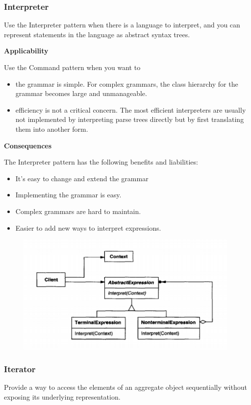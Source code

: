 \documentclass{article}
\begin{document}
\newpage
\subsubsection{Interpreter}

Use the Interpreter pattern when there is a language to interpret, and you can represent statements in the language as abstract syntax trees.

\textbf{Applicability}

Use the Command pattern when you want to

\begin{itemize}
    \item the grammar is simple. For complex grammars, the class hierarchy for the grammar becomes large and unmanageable. 
    \item efficiency is not a critical concern. The most efficient interpreters are usually not implemented by interpreting parse trees directly but by first translating them into another form.
\end{itemize}

\textbf{Consequences}

The Interpreter pattern has the following benefits and liabilities:
\begin{itemize}
    \item It's easy to change and extend the grammar
    \item Implementing the grammar is easy.
    \item Complex grammars are hard to maintain.
    \item Easier to add new ways to interpret expressions.
\end{itemize}

\begin{figure}[h]
    \centering
    \includegraphics[width=11cm]{diagrams/pattern-15-interpreter.png}
\end{figure}

\newpage
\subsubsection{Iterator}
Provide a way to access the elements of an aggregate object sequentially without exposing its underlying representation.
\end{document}
